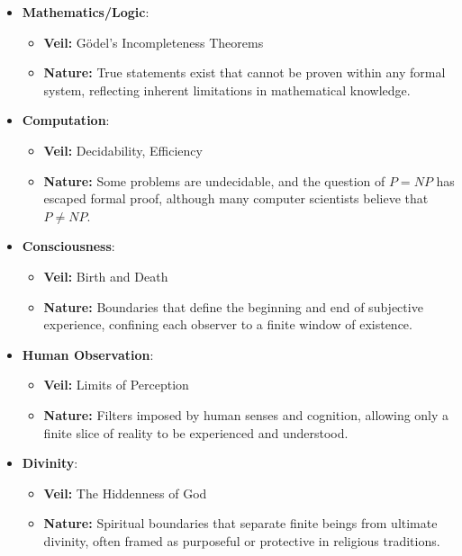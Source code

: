 \documentclass[12pt]{article}
\begin{document}
\begin{itemize}
    \item \textbf{Mathematics/Logic}:
    \begin{itemize}
        \item \textbf{Veil:} Gödel’s Incompleteness Theorems
        \item \textbf{Nature:} True statements exist that cannot be proven within any formal system, reflecting inherent limitations in mathematical knowledge.
    \end{itemize}

    \item \textbf{Computation}:
    \begin{itemize}
        \item \textbf{Veil:} Decidability, Efficiency
        \item \textbf{Nature:} Some problems are undecidable, and the question of $P = NP$ has escaped formal proof, although many computer scientists believe that $P \neq NP$.
    \end{itemize}

    \item \textbf{Consciousness}:
    \begin{itemize}
        \item \textbf{Veil:} Birth and Death
        \item \textbf{Nature:} Boundaries that define the beginning and end of subjective experience, confining each observer to a finite window of existence.
    \end{itemize}

    \item \textbf{Human Observation}:
    \begin{itemize}
        \item \textbf{Veil:} Limits of Perception
        \item \textbf{Nature:} Filters imposed by human senses and cognition, allowing only a finite slice of reality to be experienced and understood.
    \end{itemize}

    \item \textbf{Divinity}:
    \begin{itemize}
        \item \textbf{Veil:} The Hiddenness of God
        \item \textbf{Nature:} Spiritual boundaries that separate finite beings from ultimate divinity, often framed as purposeful or protective in religious traditions.
    \end{itemize}
\end{itemize}
\end{document}
